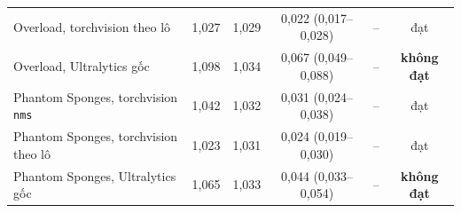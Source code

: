 \begin{table}[t]
\begin{tabular}{@{}lccccc@{}}
Overload, torchvision theo lô & 1,027 & 1,029 & 0,022 (0,017--0,028) & -- & đạt \\
Overload, Ultralytics gốc & 1,098 & 1,034 & 0,067 (0,049--0,088) & -- & \textbf{không đạt} \\
Phantom Sponges, torchvision \texttt{nms} & 1,042 & 1,032 & 0,031 (0,024--0,038) & -- & đạt \\
Phantom Sponges, torchvision theo lô & 1,023 & 1,031 & 0,024 (0,019--0,030) & -- & đạt \\
Phantom Sponges, Ultralytics gốc & 1,065 & 1,033 & 0,044 (0,033--0,054) & -- & \textbf{không đạt} \\
\bottomrule
\end{tabular}
\end{table}
